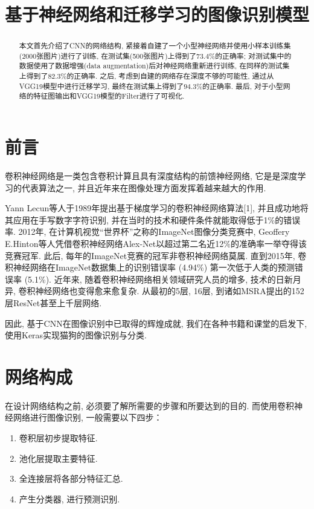 \documentclass[lang=cn,11pt]{elegantpaper}
\title{基于神经网络和迁移学习的图像识别模型}
\date{}
\begin{document}
\begin{abstract}
	本文首先介绍了CNN的网络结构, 紧接着自建了一个小型神经网络并使用小样本训练集(2000张图片)进行了训练, 在测试集(500张图片)上得到了$73.4\%$的正确率; 对测试集中的数据使用了数据增强(data augmentation)后对神经网络重新进行训练, 在同样的测试集上得到了$82.3\%$的正确率. 之后, 考虑到自建的网络存在深度不够的可能性, 通过从VGG19模型中进行迁移学习, 最终在测试集上得到了$94.3\%$的正确率. 最后, 对于小型网络的特征图输出和VGG19模型的Filter进行了可视化. 
\end{abstract}
	
\tableofcontents
\thispagestyle{empty}
\newpage
\normalsize
{}



\section{前言}
卷积神经网络是一类包含卷积计算且具有深度结构的前馈神经网络, 它是是深度学习的代表算法之一, 并且近年来在图像处理方面发挥着越来越大的作用. 

Yann Lecun等人于1989年提出基于梯度学习的卷积神经网络算法[1], 并且成功地将其应用在手写数字字符识别, 并在当时的技术和硬件条件就能取得低于1\%的错误率. 2012年, 在计算机视觉“世界杯”之称的ImageNet图像分类竞赛中, Geoffery E.Hinton等人凭借卷积神经网络Alex-Net以超过第二名近12\%的准确率一举夺得该竞赛冠军. 此后, 每年的ImageNet竞赛的冠军非卷积神经网络莫属. 直到2015年, 卷积神经网络在ImageNet数据集上的识别错误率 (4.94\%) 第一次低于人类的预测错误率 (5.1\%). 近年来, 随着卷积神经网络相关领域研究人员的增多, 技术的日新月异, 卷积神经网络也变得愈来愈复杂. 从最初的5层, 16层, 到诸如MSRA提出的152层ResNet甚至上千层网络. 

因此, 基于CNN在图像识别中已取得的辉煌成就, 我们在各种书籍和课堂的启发下, 使用Keras实现猫狗的图像识别与分类. 


\section{网络构成}
在设计网络结构之前, 必须要了解所需要的步骤和所要达到的目的. 而使用卷积神经网络进行图像识别, 一般需要以下四步：

\begin{enumerate}
	\item 卷积层初步提取特征.
	\item 池化层提取主要特征.
	\item 全连接层将各部分特征汇总.
	\item 产生分类器, 进行预测识别.
\end{enumerate}
\end{document}
